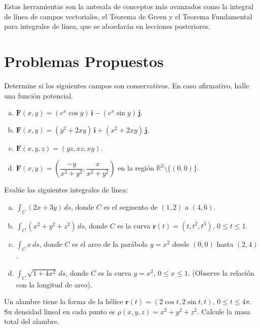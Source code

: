 Estas herramientas son la antesala de conceptos más avanzados como la
integral de línea de campos vectoriales, el Teorema de Green y el
Teorema Fundamental para integrales de línea, que se abordarán en
lecciones posteriores.

\section*{Problemas Propuestos}

\begin{prob}
Determine si los siguientes campos son conservativos. En caso
afirmativo, halle una función potencial.
\begin{enumerate}[a)]
  \item \(\mathbf{F}(x,y) = (e^x \cos y)\,\mathbf{i} - (e^x \sin y)\,\mathbf{j}\).
  \item \(\mathbf{F}(x,y) = (y^2 + 2xy)\,\mathbf{i} + (x^2 + 2xy)\,\mathbf{j}\).
  \item \(\mathbf{F}(x,y,z) = (yz, xz, xy)\).
  \item \(\mathbf{F}(x,y) = \left(\dfrac{-y}{x^2+y^2},
  \dfrac{x}{x^2+y^2}\right)\) en la región \(\mathbb{R}^2 \setminus \{(0,0)\}\).
\end{enumerate}
\end{prob}

\begin{prob}
Evalúe las siguientes integrales de línea:
\begin{enumerate}[a)]
  \item \(\displaystyle \int_C (2x + 3y)\,ds\), donde \(C\) es el
  segmento de \((1,2)\) a \((4,6)\).
  \item \(\displaystyle \int_C (x^2 + y^2 + z^2)\,ds\), donde \(C\) es
  la curva \(\mathbf{r}(t) = (t, t^2, t^3)\), \(0\le t\le 1\).
  \item \(\displaystyle \int_C x\,ds\), donde \(C\) es el arco de
  la parábola \(y = x^2\) desde \((0,0)\) hasta \((2,4)\).
  \item \(\displaystyle \int_C \sqrt{1 + 4x^2}\,ds\), donde \(C\) es
  la curva \(y = x^2\), \(0\le x\le 1\). (Observe la relación con
  la longitud de arco).
\end{enumerate}
\end{prob}

\begin{prob}
Un alambre tiene la forma de la hélice \(\mathbf{r}(t) = (2\cos t,
2\sin t, t)\), \(0 \le t \le 4\pi\). Su densidad lineal en cada punto
es \(\rho(x,y,z) = x^2 + y^2 + z^2\). Calcule la masa total del alambre.
\end{prob}

